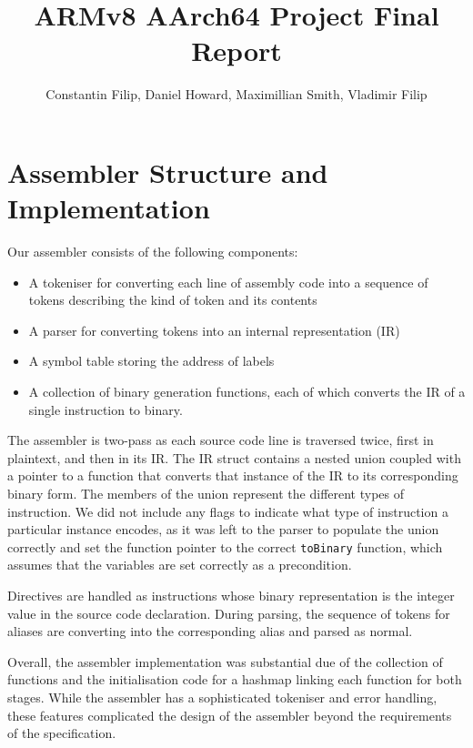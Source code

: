 \documentclass[11pt]{article}
\begin{document}
\title{ARMv8 AArch64 Project Final Report}
\author{Constantin Filip, Daniel Howard, Maximillian Smith, Vladimir Filip}

\maketitle

\section{Assembler Structure and Implementation}
Our assembler consists of the following components:
\begin{itemize}
    \item A tokeniser for converting each line of assembly code into a sequence of tokens describing the kind of token and its contents
    \item A parser for converting tokens into an internal representation (IR)
    \item A symbol table storing the address of labels
    \item A collection of binary generation functions, each of which converts the IR of a single instruction to binary.
\end{itemize}
The assembler is two-pass as each source code line is traversed twice, first in plaintext, and then in its IR. The IR struct contains a nested union coupled with a pointer to a function that converts that instance of the IR to its corresponding binary form. The members of the union represent the different types of instruction. We did not include any flags to indicate what type of instruction a particular instance encodes, as it was left to the parser to populate the union correctly and set the function pointer to the correct \texttt{toBinary} function, which assumes that the variables are set correctly as a precondition.

Directives are handled as instructions whose binary representation is the integer value in the source code declaration. During parsing, the sequence of tokens for aliases are converting into the corresponding alias and parsed as normal.

Overall, the assembler implementation was substantial due of the collection of functions and the initialisation code for a hashmap linking each function for both stages. While the assembler has a sophisticated tokeniser and error handling, these features complicated the design of the assembler beyond the requirements of the specification.
\end{document}
